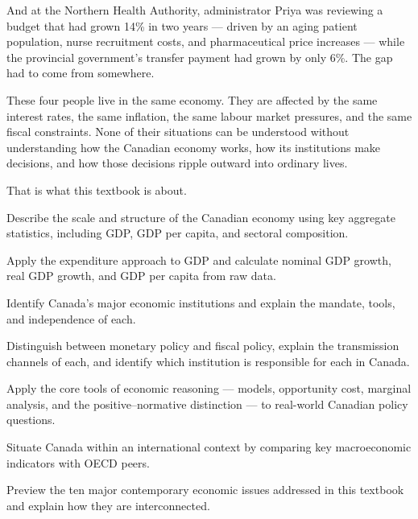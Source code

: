 And at the Northern Health Authority, administrator Priya was reviewing a
budget that had grown 14\% in two years --- driven by an aging patient
population, nurse recruitment costs, and pharmaceutical price increases ---
while the provincial government's transfer payment had grown by only 6\%.
The gap had to come from somewhere.

These four people live in the same economy. They are affected by the same
interest rates, the same inflation, the same labour market pressures, and the
same fiscal constraints. None of their situations can be understood without
understanding how the Canadian economy works, how its institutions make
decisions, and how those decisions ripple outward into ordinary lives.

That is what this textbook is about.


\begin{learningobjectives}
  \item Describe the scale and structure of the Canadian economy using key
        aggregate statistics, including GDP, GDP per capita, and sectoral
        composition.
  \item Apply the expenditure approach to GDP and calculate nominal GDP growth,
        real GDP growth, and GDP per capita from raw data.
  \item Identify Canada's major economic institutions and explain the mandate,
        tools, and independence of each.
  \item Distinguish between monetary policy and fiscal policy, explain the
        transmission channels of each, and identify which institution is
        responsible for each in Canada.
  \item Apply the core tools of economic reasoning --- models, opportunity cost,
        marginal analysis, and the positive--normative distinction --- to
        real-world Canadian policy questions.
  \item Situate Canada within an international context by comparing key
        macroeconomic indicators with OECD peers.
  \item Preview the ten major contemporary economic issues addressed in this
        textbook and explain how they are interconnected.
\end{learningobjectives}

